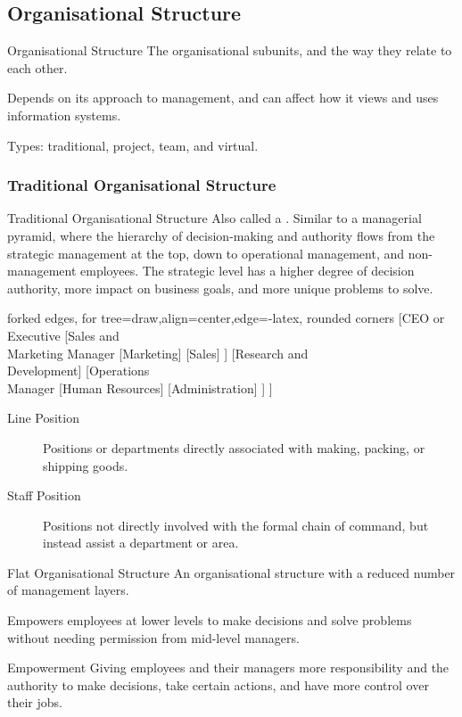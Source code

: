 \documentclass[\main/notes.tex]{subfiles}
\begin{document}
			\subsection{Organisational Structure}
				\begin{definition}{Organisational Structure}
					The organisational subunits, and the way they relate to each other.

					Depends on its approach to management, and can affect how it views and uses information systems.

					Types: traditional, project, team, and virtual.
				\end{definition}
				\subsubsection{Traditional Organisational Structure}
					\begin{definition}{Traditional Organisational Structure}
						Also called a . Similar to a managerial pyramid, where the hierarchy of decision-making and authority flows from the strategic management at the top, down to operational management, and non-management employees. The strategic level has a higher degree of decision authority, more impact on business goals, and more unique problems to solve.
						\begin{center}
							\begin{forest}
								forked edges,
								for tree={draw,align=center,edge={-latex}, rounded corners}
								[CEO or Executive
									[Sales and \\ Marketing Manager
										[Marketing]
										[Sales]
									]
									[Research and \\ Development]
									[Operations \\ Manager
										[Human Resources]
										[Administration]
									]
								]
							\end{forest}
						\end{center}
						\begin{description}
							\item[Line Position] Positions or departments directly associated with making, packing, or shipping goods.
							\item[Staff Position] Positions not directly involved with the formal chain of command, but instead assist a department or area.
						\end{description}
					\end{definition}
					\begin{definition}{Flat Organisational Structure}
						An organisational structure with a reduced number of management layers.

						Empowers employees at lower levels to make decisions and solve problems without needing permission from mid-level managers.
					\end{definition}
					\begin{definition}{Empowerment}
						Giving employees and their managers more responsibility and the authority to make decisions, take certain actions, and have more control over their jobs.
					\end{definition}
\end{document}
